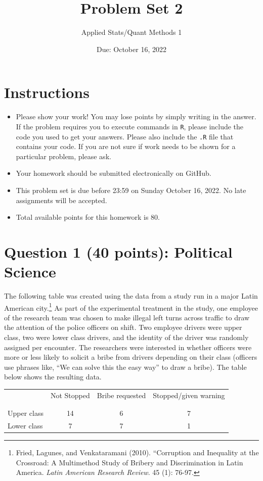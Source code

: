 \documentclass[12pt,letterpaper]{article}
\title{Problem Set 2}
\date{Due: October 16, 2022}
\author{Applied Stats/Quant Methods 1}
\begin{document}
	\maketitle
	\section*{Instructions}
\begin{itemize}
	\item Please show your work! You may lose points by simply writing in the answer. If the problem requires you to execute commands in \texttt{R}, please include the code you used to get your answers. Please also include the \texttt{.R} file that contains your code. If you are not sure if work needs to be shown for a particular problem, please ask.
	\item Your homework should be submitted electronically on GitHub.
	\item This problem set is due before 23:59 on Sunday October 16, 2022. No late assignments will be accepted.
	\item Total available points for this homework is 80.
\end{itemize}

	
	\vspace{.5cm}
	\section*{Question 1 (40 points): Political Science}
		\vspace{.25cm}
	The following table was created using the data from a study run in a major Latin American city.\footnote{Fried, Lagunes, and Venkataramani (2010). ``Corruption and Inequality at the Crossroad: A Multimethod Study of Bribery and Discrimination in Latin America. \textit{Latin American Research Review}. 45 (1): 76-97.} As part of the experimental treatment in the study, one employee of the research team was chosen to make illegal left turns across traffic to draw the attention of the police officers on shift. Two employee drivers were upper class, two were lower class drivers, and the identity of the driver was randomly assigned per encounter. The researchers were interested in whether officers were more or less likely to solicit a bribe from drivers depending on their class (officers use phrases like, ``We can solve this the easy way'' to draw a bribe). The table below shows the resulting data.

\newpage
\begin{table}[h!]
	\centering
	\begin{tabular}{l | c c c }
		& Not Stopped & Bribe requested & Stopped/given warning \\
		\\[-1.8ex] 
		\hline \\[-1.8ex]
		Upper class & 14 & 6 & 7 \\
		Lower class & 7 & 7 & 1 \\
		\hline
	\end{tabular}
\end{table}
\end{document}
